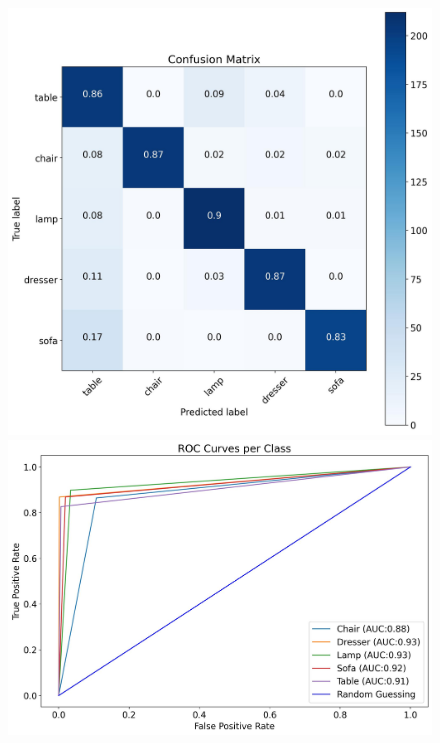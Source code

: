 \documentclass[11pt,a4paper]{article}
\begin{document}
\begin{figure}[H]
{{    \includegraphics[scale=0.13]{imgs/experiments/pointclouds/pointnet-7/PointNet-7-TESTING-confusion-matrix.jpg}
    \includegraphics[scale=0.13]{imgs/experiments/pointclouds/pointnet-7/PointNet-7-TESTING-ROC.jpg}
    }}
    \qquad
\end{figure}
\end{document}
